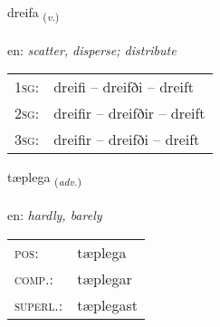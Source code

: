 \documentclass[frontgrid, backgrid]{flacards}\usepackage[]{graphicx}\usepackage[]{color}
\begin{document}
\renewcommand{\flhead}{\vskip5pt \fboxsep=0pt {\small\bfseries\footnotesize Sagnorð | Verb}}
\renewcommand{\fcfoot}{\vskip5pt \fboxsep=0pt \hspace{2pt}{\small\bfseries\footnotesize 2K}}

\renewcommand{\blhead}{\vskip5pt {\small\bfseries\footnotesize Sagnorð | Verb }}
\renewcommand{\bcfoot}{\vskip5pt \hspace{2pt}{\small\bfseries\footnotesize 2K}}


{dreifa \small{\textsubscript{(\textit{v.})}} \\[1ex] %
\textphonetic{[treiːva]} \\
en: \emph{scatter, disperse; distribute} \\  [2ex]
\renewcommand*{\arraystretch}{0.8}
\begin{tabular}{p{1cm}l}
\textsc{1sg}: & dreifi -- dreifði -- dreift \\ 
\textsc{2sg}: & dreifir -- dreifðir -- dreift \\ 
\textsc{3sg}: & dreifir -- dreifði -- dreift \\ 
\end{tabular}
}

\renewcommand{\flhead}{\vskip5pt \fboxsep=0pt {\small\bfseries\footnotesize Atviksorð | Adverb}}
\renewcommand{\fcfoot}{\vskip5pt \fboxsep=0pt \hspace{2pt}{\small\bfseries\footnotesize 2K}}

\renewcommand{\blhead}{\vskip5pt {\small\bfseries\footnotesize Atviksorð | Adverb }}
\renewcommand{\bcfoot}{\vskip5pt \hspace{2pt}{\small\bfseries\footnotesize 2K}}


{tæplega \small{\textsubscript{(\textit{adv.})}} \\[1ex] %
\textphonetic{[tʰaiplɛɣa]} \\
en: \emph{hardly, barely} \\  [2ex]
\renewcommand*{\arraystretch}{0.8}
\begin{tabular}{ll}
\textsc{pos}: & tæplega \\ 
\textsc{comp.}: & tæplegar \\ 
\textsc{superl.}: & tæplegast \\
\end{tabular}
}
\end{document}
